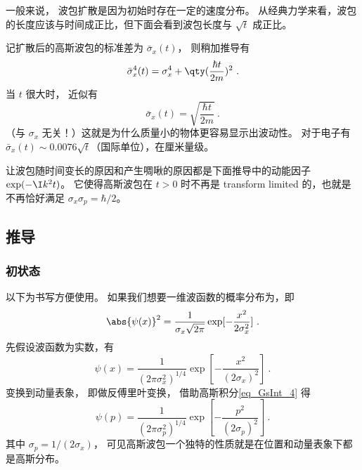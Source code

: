 一般来说， 波包扩散是因为初始时存在一定的速度分布。 从经典力学来看，波包的长度应该与时间成正比，但下面会看到波包长度与 $\sqrt{t}$ 成正比。

记扩散后的高斯波包的标准差为 $\bar\sigma_x(t)$， 则稍加推导有
\begin{equation}
\bar\sigma^4_x(t) = \sigma_x^4 + \qty(\frac{\hbar t}{2m})^2~.
\end{equation}
当 $t$ 很大时， 近似有
\begin{equation}
\bar\sigma_x(t) = \sqrt{\frac{\hbar t}{2m}}~.
\end{equation}
（与 $\sigma_x$ 无关！）这就是为什么质量小的物体更容易显示出波动性。 对于电子有 $\bar\sigma_x(t) \sim 0.0076\sqrt{t}$（国际单位），在厘米量级。

让波包随时间变长的原因和产生啁啾的原因都是下面推导中的动能因子 $\exp(-\I k^2 t)$。 它使得高斯波包在 $t > 0$ 时不再是 transform limited 的，也就是不再恰好满足 $\sigma_x \sigma_p = \hbar/2$。

\subsection{推导}
\subsubsection{初状态}

以下为书写方便使用。 如果我们想要一维波函数的概率分布为，即
\begin{equation}
\abs{\psi (x)}^2 = \frac{1}{\sigma_x \sqrt{2\pi}} \exp[-\frac{x^2}{2\sigma_x^2}]~.
\end{equation}
先假设波函数为实数，有
\begin{equation}
\psi (x) = \frac{1}{(2\pi\sigma_x^2)^{1/4}} \exp[-\frac{x^2}{(2\sigma_x)^2}]~.
\end{equation}
变换到动量表象， 即做反傅里叶变换， 借助高斯积分\autoref{eq_GsInt_4}  得
\begin{equation}
\psi(p) = \frac{1}{(2\pi\sigma_p^2)^{1/4}} \exp[-\frac{p^2}{(2\sigma_p)^2}]~.
\end{equation}
其中 $\sigma_p = 1/(2\sigma_x)$， 可见高斯波包一个独特的性质就是在位置和动量表象下都是高斯分布。

